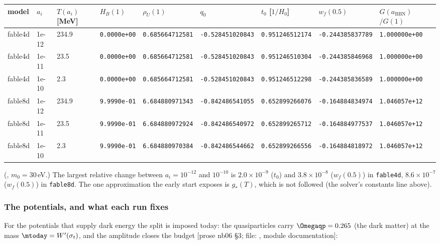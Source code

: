 {\scriptsize
\setlength{\tabcolsep}{2pt}
\begin{longtable}{@{}lllllllll@{}}
\toprule
model & $a_i$ & \parbox[t]{0.9cm}{\raggedright$T(a_i)$\\ {}[MeV]} & $H_B(1)$ & $\rho_U(1)$ & $q_0$ & $t_0$ [$1/H_0$] & $w_f(0.5)$ & \parbox[t]{1.3cm}{\raggedright$G(a_{\mathrm{BBN}})$\\ ${}/G(1)$} \tabularnewline
\midrule
\endhead
fable4d & 1e-12 & 234.9 & \texttt{0.0000e+00} & \texttt{0.685664712581} & \texttt{-0.528451020843} & \texttt{0.951246512174} & \texttt{-0.244385837789} & \texttt{1.000000e+00} \tabularnewline
fable4d & 1e-11 & 23.5 & \texttt{0.0000e+00} & \texttt{0.685664712581} & \texttt{-0.528451020843} & \texttt{0.951246510304} & \texttt{-0.244385846968} & \texttt{1.000000e+00} \tabularnewline
fable4d & 1e-10 & 2.3 & \texttt{0.0000e+00} & \texttt{0.685664712581} & \texttt{-0.528451020843} & \texttt{0.951246512298} & \texttt{-0.244385836589} & \texttt{1.000000e+00} \tabularnewline
fable8d & 1e-12 & 234.9 & \texttt{9.9990e-01} & \texttt{6.684880971343} & \texttt{-0.842486541055} & \texttt{0.652899266076} & \texttt{-0.164884834974} & \texttt{1.046057e+12} \tabularnewline
fable8d & 1e-11 & 23.5 & \texttt{9.9990e-01} & \texttt{6.684880972924} & \texttt{-0.842486540972} & \texttt{0.652899265712} & \texttt{-0.164884977537} & \texttt{1.046057e+12} \tabularnewline
fable8d & 1e-10 & 2.3 & \texttt{9.9990e-01} & \texttt{6.684880970384} & \texttt{-0.842486544662} & \texttt{0.652899266556} & \texttt{-0.164884818972} & \texttt{1.046057e+12} \tabularnewline
\bottomrule
\end{longtable}
}

\noindent(, $m_0=30$\,eV.) The largest relative change between $a_i=10^{-12}$ and
$10^{-10}$ is $2.0\times10^{-9}$ ($t_0$) and $3.8\times10^{-8}$ ($w_f(0.5)$) in \texttt{fable4d},
$8.6\times10^{-7}$ ($w_f(0.5)$) in \texttt{fable8d}. The one approximation the early start exposes is
$g_*(T)$, which is not followed (the solver's constants line above).

\subsubsection{The potentials, and what each run fixes}
\label{sec:4.7.3}

For the potentials that supply dark energy the split is imposed today: the quasiparticles carry
$\Omegaqp=0.265$ (the dark matter) at the mass $\mtoday=W'(\sigma_t)$, and the amplitude closes the budget
[prose nb06 \S3; file: , module documentation]:

